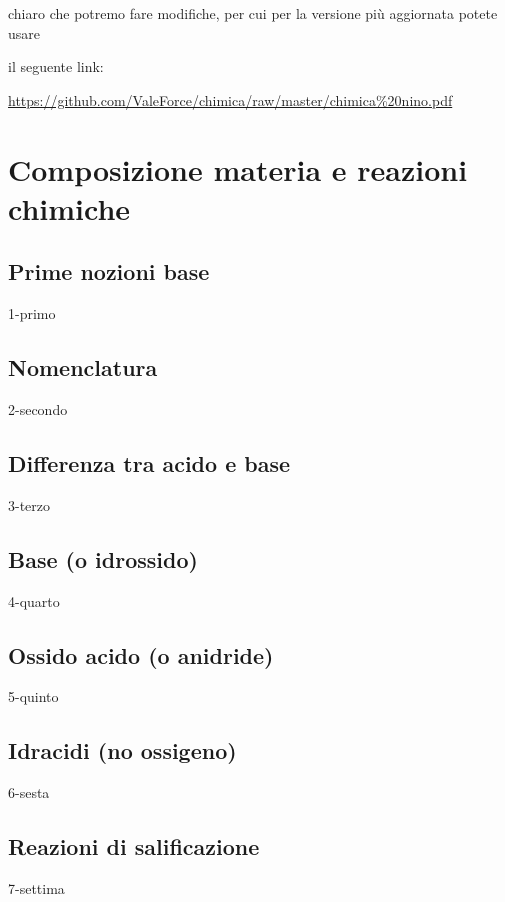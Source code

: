 \documentclass[12pt]{book}%
\newcommand\blankpage{%
    \null
    \thispagestyle{empty}%
    \newpage}
\newcommand{\comment}[1]{}
\begin{document}
chiaro che potremo fare modifiche, per cui per la versione più aggiornata potete usare

il seguente link:

\begin{center}
\url{https://github.com/ValeForce/chimica/raw/master/chimica%20nino.pdf}
\end{center}

\afterpage{\blankpage}
\newpage

\chapter{Composizione materia e reazioni chimiche}

  \section{Prime nozioni base}
    {1-primo}

    \newpage

  \section{Nomenclatura}
    {2-secondo}

  \section{Differenza tra acido e base}
    {3-terzo}

  \section{Base (o idrossido)}
    {4-quarto}

  \section{Ossido acido (o anidride)}
    {5-quinto}

  \section{Idracidi (no ossigeno)}
    {6-sesta}

  \section{Reazioni di salificazione}
    {7-settima}
\end{document}
